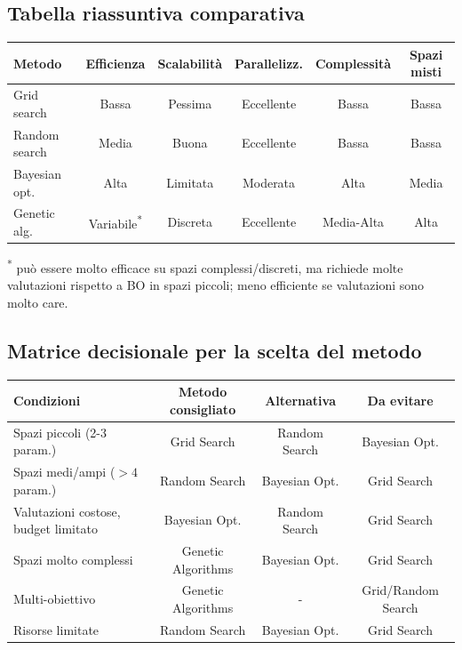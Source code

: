 \documentclass[a4paper,12pt]{report}
\begin{document}
	\subsection{Tabella riassuntiva comparativa}
	\begin{table}[H]
		\centering
		\small
		\begin{tabular}{lccccc}
			\toprule
			\textbf{Metodo} & \textbf{Efficienza} & \textbf{Scalabilità} & \textbf{Parallelizz.} & \textbf{Complessità} & \textbf{Spazi misti}\\
			\midrule
			Grid search & Bassa & Pessima & Eccellente & Bassa & Bassa\\
			Random search & Media & Buona & Eccellente & Bassa & Bassa\\
			Bayesian opt. & Alta & Limitata & Moderata & Alta & Media\\
			Genetic alg. & Variabile\textsuperscript{*} & Discreta & Eccellente & Media-Alta & Alta\\
			\bottomrule
		\end{tabular}
	\end{table}
	\textsuperscript{*} può essere molto efficace su spazi complessi/discreti, ma richiede molte valutazioni rispetto a BO in spazi piccoli; meno efficiente se valutazioni sono molto care.
	
	\subsection{Matrice decisionale per la scelta del metodo}
	\begin{table}[H]
		\centering
		\footnotesize
		\begin{tabular}{lccc}
			\toprule
			\textbf{Condizioni} & \textbf{Metodo consigliato} & \textbf{Alternativa} & \textbf{Da evitare}\\
			\midrule
			Spazi piccoli (2-3 param.) & Grid Search & Random Search & Bayesian Opt.\\
			Spazi medi/ampi ($>4$ param.) & Random Search & Bayesian Opt. & Grid Search\\
			Valutazioni costose, budget limitato & Bayesian Opt. & Random Search & Grid Search\\
			Spazi molto complessi & Genetic Algorithms & Bayesian Opt. & Grid Search\\
			Multi-obiettivo & Genetic Algorithms & - & Grid/Random Search\\
			Risorse limitate & Random Search & Bayesian Opt. & Grid Search\\
			\bottomrule
		\end{tabular}
	\end{table}
	
\end{document}
